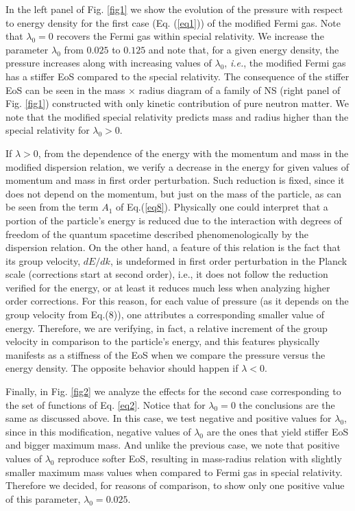 \documentclass[final,5p,times,twocolumn]{elsarticle}
\begin{document}
In the left panel of  Fig. \ref{fig1} we show the evolution of the pressure with respect to energy density for the first case (Eq. (\ref{eq1})) of the modified Fermi gas. Note that $\lambda_0 = 0$ recovers the Fermi gas within special relativity. We increase the parameter $\lambda_0$  from $0.025$ to $0.125$ and note that, for a given energy density, the pressure increases along with increasing values of $\lambda_0$, {\it i.e.}, the modified Fermi gas has a stiffer EoS compared to the special relativity.
The consequence of the stiffer EoS can be seen in the mass $\times$ radius diagram of a family of NS (right panel of Fig. \ref{fig1}) constructed with only kinetic contribution of pure neutron matter. We note that the modified special relativity predicts mass and radius higher than the special relativity for $\lambda_0>0$. 

If $\lambda>0$, from the dependence of the energy with the momentum and mass in the modified dispersion relation, we verify a decrease in the energy for given values of momentum and mass in first order perturbation. Such reduction is fixed, since it does not depend on the momentum, but just on the mass of the particle, as can be seen from the term $A_1$ of Eq.(\ref{eq8}). Physically one could interpret that a portion of the particle’s energy is reduced due to the interaction with degrees of freedom of the quantum spacetime described phenomenologically by the dispersion relation. On the other hand, a feature of this relation is the fact that its group velocity, $dE/dk$, is undeformed in first order perturbation in the Planck scale (corrections start at second order), i.e., it does not follow the reduction verified for the energy, or at least it reduces much less when analyzing higher order corrections. For this reason, for each value of pressure (as it depends on the group velocity from Eq.(8)), one attributes a corresponding smaller value of energy. Therefore, we are verifying, in fact, a relative increment of the group velocity in comparison to the particle's energy, and this features physically manifests as a stiffness of the EoS when we compare the pressure versus the energy density. The opposite behavior should happen if $\lambda <0$.

Finally, in Fig. \ref{fig2} we analyze the effects for the second case corresponding to the set of functions of Eq. \ref{eq2}. Notice that for $\lambda_0=0$ the conclusions are the same as discussed above. In this case, we test negative and positive values for $\lambda_0$, since in this modification, negative values of $\lambda_0$ are the ones that yield stiffer EoS and bigger maximum mass. And unlike the previous case, we note that positive values of $\lambda_0$ reproduce softer EoS, resulting in mass-radius relation with slightly smaller maximum mass values when compared to Fermi gas in special relativity. Therefore we decided, for reasons of comparison, to show only one positive value of this parameter, $\lambda_0=0.025$.
\end{document}

